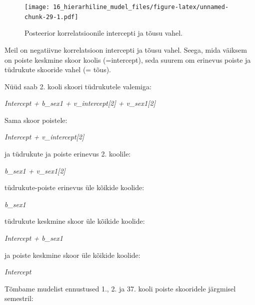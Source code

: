\documentclass[]{book}
\begin{document}
\begin{figure}
\centering
\texttt{[image: 16\_hierarhiline\_mudel\_files/figure-latex/unnamed-chunk-29-1.pdf]}
\caption{\label{fig:unnamed-chunk-29}Posteerior korrelatsioonile intercepti ja tõusu vahel.}
\end{figure}

Meil on negatiivne korrelatsioon intercepti ja tõusu vahel. Seega, mida väiksem on poiste keskmine skoor koolis (=intercept), seda suurem om erinevus poiste ja tüdrukute skooride vahel (= tõus).

Nüüd saab 2. kooli skoori tüdrukutele valemiga:

\emph{Intercept + b\_sex1 + v\_intercept{[}2{]} + v\_sex1{[}2{]}}

Sama skoor poistele:

\emph{Intercept + v\_intercept{[}2{]}}

ja tüdrukute ja poiste erinevus 2. koolile:

\emph{b\_sex1 + v\_sex1{[}2{]}}

tüdrukute-poiste erinevus üle kõikide koolide:

\emph{b\_sex1}

tüdrukute keskmine skoor üle kõikide koolide:

\emph{Intercept + b\_sex1}

ja poiste keskmine skoor üle kõikide koolide:

\emph{Intercept}

Tõmbame mudelist ennustused 1., 2. ja 37. kooli poiste skooridele järgmisel semestril:
\end{document}
